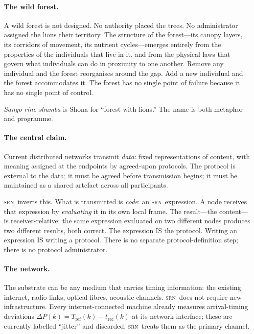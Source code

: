 \documentclass[twocolumn,11pt,a4paper]{article}
\theoremstyle{definition}
\theoremstyle{remark}
\newcommand{\srn}{\textsc{srn}}
\begin{document}
\paragraph{The wild forest.}
A wild forest is not designed.  No authority placed the trees.  No
administrator assigned the lions their territory.  The structure of the
forest---its canopy layers, its corridors of movement, its nutrient
cycles---emerges entirely from the properties of the individuals that
live in it, and from the physical laws that govern what individuals can
do in proximity to one another.  Remove any individual and the forest
reorganises around the gap.  Add a new individual and the forest
accommodates it.  The forest has no single point of failure because it
has no single point of control.

\emph{Sango rine shumba} is Shona for ``forest with lions.''  The name
is both metaphor and programme.

\paragraph{The central claim.}
Current distributed networks transmit \emph{data}: fixed representations
of content, with meaning assigned at the endpoints by agreed-upon
protocols.  The protocol is external to the data; it must be agreed
before transmission begins; it must be maintained as a shared artefact
across all participants.

\srn\ inverts this.  What is transmitted is \emph{code}: an
\srn\ expression.  A node receives that expression by \emph{evaluating}
it in its own local frame.  The result---the content---is receiver-relative:
the same expression evaluated on two different nodes produces two
different results, both correct.  The expression IS the protocol.
Writing an expression IS writing a protocol.  There is no separate
protocol-definition step; there is no protocol administrator.

\paragraph{The network.}
The substrate can be any medium that carries timing information:
the existing internet, radio links, optical fibres, acoustic channels.
\srn\ does not require new infrastructure.  Every
internet-connected machine already measures arrival-timing deviations
$\Delta P(k) = T_{\mathrm{ref}}(k) - t_{\mathrm{rec}}(k)$ at its
network interface; these are currently labelled ``jitter'' and
discarded.  \srn\ treats them as the primary channel.
\end{document}
